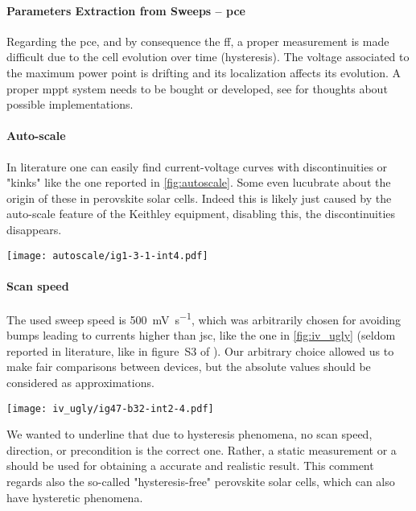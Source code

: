 	\paragraph{Parameters Extraction from Sweeps -- \gls{pce}} Regarding the \gls{pce}, and by consequence the \gls{ff}, a proper measurement is made difficult due to the cell evolution over time (hysteresis). The voltage associated to the maximum power point is drifting and its localization affects its evolution. A proper \gls{mppt} system needs to be bought or developed, see  for thoughts about possible implementations.

	\paragraph{Auto-scale}\label{autoscale} In literature one can easily find current-voltage curves with discontinuities or "kinks" \cite{Li2016,Snaith2014,Zhang2015} like the one reported in \cref{fig:autoscale}. Some even lucubrate about the origin of these in perovskite solar cells. Indeed this is likely just caused by the auto-scale feature of the Keithley equipment, disabling this, the discontinuities disappears.

	\begin{SCfigure}%
		\centering
		\texttt{[image: autoscale/ig1-3-1-int4.pdf]}
		\label{fig:autoscale}
	\end{SCfigure}

	\paragraph{Scan speed} The used sweep speed is \SI{500}{\mV\per\s}, which was arbitrarily chosen for avoiding bumps leading to currents higher than \gls{jsc}, like the one in \cref{fig:iv_ugly} (seldom reported in literature, like in figure~S3 of \cite{Du2018}). %
	Our arbitrary choice allowed us to make fair comparisons between devices, but the absolute values should be considered as approximations.
	\begin{SCfigure}%
		\centering
		\texttt{[image: iv\_ugly/ig47-b32-int2-4.pdf]}
		\label{fig:iv_ugly}
	\end{SCfigure}
	We wanted to underline that due to hysteresis phenomena, no scan speed, direction, or precondition is the correct one.  %
	Rather, a static measurement or a  should be used for obtaining a accurate and realistic result.
	This comment regards also the so-called "hysteresis-free" perovskite solar cells, which can also have hysteretic phenomena\cite{Jacobs2018}.

